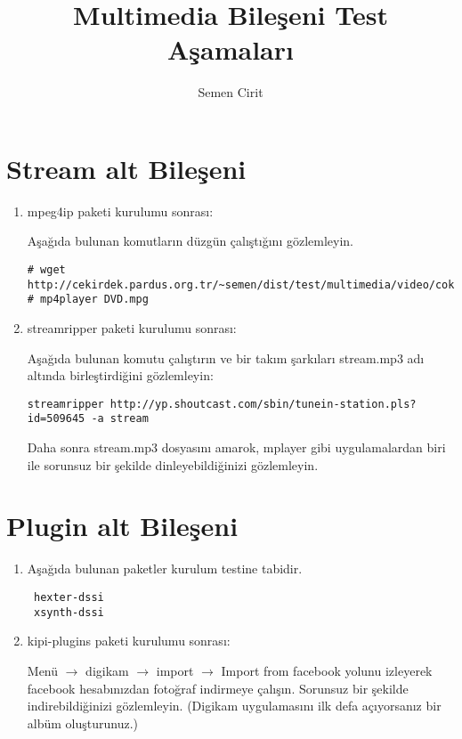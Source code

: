 \documentclass[a4paper,10pt]{article}
\title{Multimedia Bileşeni Test Aşamaları}
\author{Semen Cirit}
\begin{document}
\maketitle
\section{Stream alt Bileşeni}
\begin{enumerate}
 \item mpeg4ip paketi kurulumu sonrası:

Aşağıda bulunan komutların düzgün çalıştığını gözlemleyin.
\begin{verbatim}
# wget http://cekirdek.pardus.org.tr/~semen/dist/test/multimedia/video/cokluortam/DVD.mpg 
# mp4player DVD.mpg
\end{verbatim}


 \item streamripper paketi kurulumu sonrası:

Aşağıda bulunan komutu çalıştırın ve bir takım şarkıları stream.mp3 adı altında birleştirdiğini gözlemleyin:
\begin{verbatim}
streamripper http://yp.shoutcast.com/sbin/tunein-station.pls?id=509645 -a stream 
\end{verbatim}

Daha sonra stream.mp3 dosyasını amarok, mplayer gibi uygulamalardan biri ile sorunsuz bir şekilde dinleyebildiğinizi gözlemleyin.

\end{enumerate}


\section{Plugin alt Bileşeni}
\begin{enumerate}
 \item Aşağıda bulunan paketler kurulum testine tabidir.
\begin{verbatim}
 hexter-dssi
 xsynth-dssi
\end{verbatim}


 \item kipi-plugins paketi kurulumu sonrası:

Menü $\rightarrow$ digikam $\rightarrow$ import $\rightarrow$ Import from facebook yolunu izleyerek facebook hesabınızdan fotoğraf indirmeye çalışın. Sorunsuz bir şekilde indirebildiğinizi gözlemleyin. (Digikam uygulamasını ilk defa açıyorsanız bir albüm oluşturunuz.)
\end{enumerate}
\end{document}
